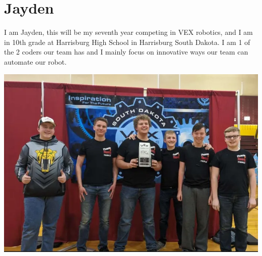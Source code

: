    \section*{Jayden}
I am Jayden, this will be my seventh year competing in VEX robotics, and I am in 10th grade at Harrisburg High School in Harrisburg South Dakota. I am 1 of the 2 coders our team has and I mainly focus on innovative ways our team can automate our robot. 
\label{Jayden}
\begin{center}
    \includegraphics[width=0.9\linewidth]{images/Innovate wo Ezra.png}
    \label{fig:innovate}
\end{center}

